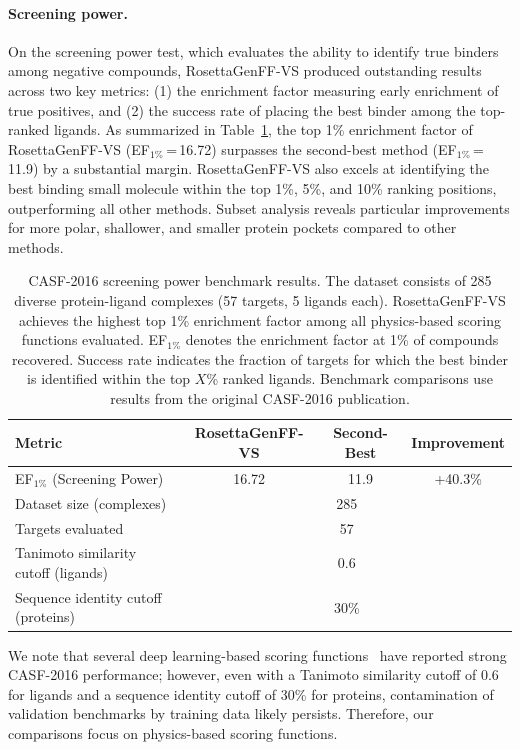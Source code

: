 \documentclass[11pt]{article}
\begin{document}
\paragraph{Screening power.} On the screening power test, which evaluates the ability to identify true binders among negative compounds, RosettaGenFF-VS produced outstanding results across two key metrics: (1) the enrichment factor measuring early enrichment of true positives, and (2) the success rate of placing the best binder among the top-ranked ligands. As summarized in Table~\ref{tab:casf2016}, the top 1\% enrichment factor of RosettaGenFF-VS (EF$_{1\%}$\,=\,16.72) surpasses the second-best method (EF$_{1\%}$\,=\,11.9) by a substantial margin. RosettaGenFF-VS also excels at identifying the best binding small molecule within the top 1\%, 5\%, and 10\% ranking positions, outperforming all other methods. Subset analysis reveals particular improvements for more polar, shallower, and smaller protein pockets compared to other methods.

\begin{table}[!ht]
\centering
\caption{CASF-2016 screening power benchmark results. The dataset consists of 285 diverse protein-ligand complexes (57 targets, 5 ligands each). RosettaGenFF-VS achieves the highest top 1\% enrichment factor among all physics-based scoring functions evaluated. EF$_{1\%}$ denotes the enrichment factor at 1\% of compounds recovered. Success rate indicates the fraction of targets for which the best binder is identified within the top $X$\% ranked ligands. Benchmark comparisons use results from the original CASF-2016 publication.}
\label{tab:casf2016}
\begin{tabular}{lccc}
\toprule
\textbf{Metric} & \textbf{RosettaGenFF-VS} & \textbf{Second-Best} & \textbf{Improvement} \\
\midrule
EF$_{1\%}$ (Screening Power) & 16.72 & 11.9 & +40.3\% \\
Dataset size (complexes) & \multicolumn{3}{c}{285} \\
Targets evaluated & \multicolumn{3}{c}{57} \\
Tanimoto similarity cutoff (ligands) & \multicolumn{3}{c}{0.6} \\
Sequence identity cutoff (proteins) & \multicolumn{3}{c}{30\%} \\
\bottomrule
\end{tabular}
\end{table}

We note that several deep learning-based scoring functions~\citep{mcnutt2021gnina,lu2022tankbind} have reported strong CASF-2016 performance; however, even with a Tanimoto similarity cutoff of 0.6 for ligands and a sequence identity cutoff of 30\% for proteins, contamination of validation benchmarks by training data likely persists. Therefore, our comparisons focus on physics-based scoring functions.
\end{document}
